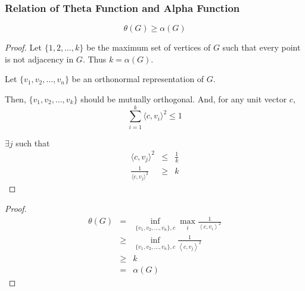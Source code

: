       \begin{frame}
            \frametitle{Relation of Theta Function and Alpha Function}

            \begin{lemma}
                  \begin{equation}
                        \theta(G) \geq \alpha(G)
                  \end{equation}
            \end{lemma}
      \end{frame}

      \begin{frame}
            \begin{proof}
                  Let $ \{1,2,\dots,k\} $ be the maximum set of vertices of $ G $ such that every point is not adjacency in $ G $. Thus $ k = \alpha(G) $.

                  Let $ \{v_1, v_2, \dots, v_n\} $ be an orthonormal representation of $ G $.

                  Then, $\{v_{1},v_{2},\hdots,v_{k}\}$ should be mutually orthogonal. And, for any unit vector $c$,
                  \begin{equation}
                        \sum_{i=1}^{k} \langle c, v_{i} \rangle^{2} \le 1
                  \end{equation}

                  $\exists j$ such that
                  \begin{eqnarray}
                        \langle c, v_{j} \rangle^{2} &\le& \frac{1}{k} \\
                        \frac{1}{\langle c, v_{j} \rangle^{2}} &\ge& k
                  \end{eqnarray}
                  
            \end{proof}
      \end{frame}

      \begin{frame}
            \begin{proof}
                  \begin{eqnarray}
                        \theta(G) &=& \inf_{\{v_1, v_2, \dots, v_n\},c} \max_{i} \frac{1}{\left<c,v_{i}\right>^2} \\
                              &\ge& \inf_{\{v_1, v_2, \dots, v_n\},c} \frac{1}{\left<c,v_{j}\right>^2} \\
                              &\ge& k \\
                              &=& \alpha(G)
                  \end{eqnarray}
            \end{proof}
      \end{frame}

